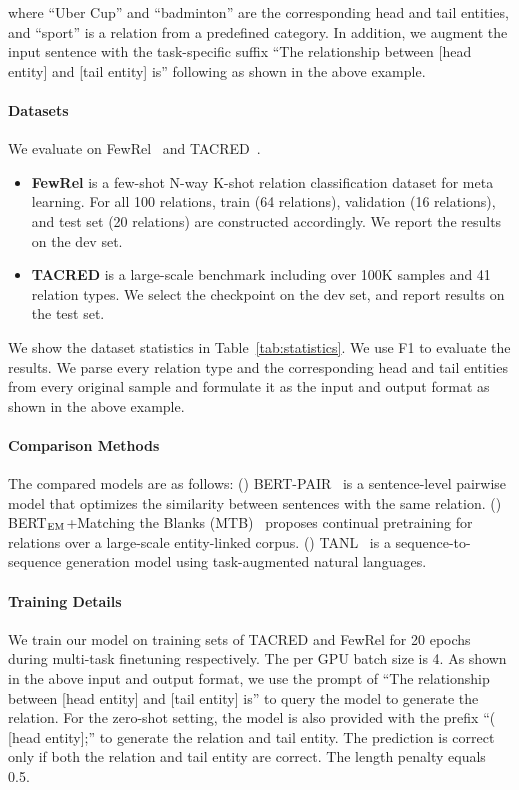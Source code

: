 \noindent where ``Uber Cup'' and ``badminton'' are the corresponding head and tail entities, and ``sport'' is a relation from a predefined category. In addition, we augment the input sentence with the task-specific suffix ``The relationship between [head entity] and [tail entity] is'' following \cite{paolini2021structured} as shown in the above example.

\paragraph{Datasets} We evaluate on FewRel~\cite{han2018fewrel} and TACRED~\cite{zhang2017tacred}. 
\begin{itemize}
    \item {\bf FewRel} is a few-shot N-way K-shot relation classification dataset for meta learning. For all 100 relations, train (64 relations), validation (16 relations), and test set (20 relations) are constructed accordingly. We report the results on the dev set.
    \item {\bf TACRED} is a large-scale benchmark including over 100K samples and 41 relation types. We select the checkpoint on the dev set, and report results on the test set.
\end{itemize}
We show the dataset statistics in Table~\ref{tab:statistics}. 
We use F1 to evaluate the results. We parse every relation type and the corresponding head and tail entities from every original sample and formulate it as the input and output format as shown in the above example.

\paragraph{Comparison Methods} The compared models are as follows: (\expandafter{}) BERT-PAIR~\cite{gao2019fewrel} is a sentence-level pairwise model that optimizes the similarity between sentences with the same relation. (\expandafter{}) BERT$_{\rm EM}$+Matching the Blanks (MTB)~\cite{soares2019matching} proposes continual pretraining for relations over a large-scale entity-linked corpus. (\expandafter{}) TANL~\cite{paolini2021structured} is a sequence-to-sequence generation model using task-augmented natural languages.  

\paragraph{Training Details} 
We train our model on training sets of TACRED and FewRel for 20 epochs during multi-task finetuning respectively. The per GPU batch size is 4. As shown in the above input and output format, we use the prompt of ``The relationship between [head entity] and [tail entity] is'' to query the model to generate the relation. For the zero-shot setting, the model is also provided with the prefix ``( [head entity];'' to generate the relation and tail entity. The prediction is correct only if both the relation and tail entity are correct. The length penalty equals 0.5.

